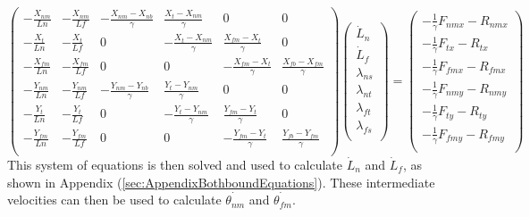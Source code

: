 \documentclass[
11pt, %
english, %
singlespacing, %
headsepline, %
chapterinoneline, %
]{MastersDoctoralThesis} %
\begin{document}
\[
\begin{pmatrix}
  -\frac{X_{nm}}{Ln} & -\frac{X_{nm}}{Lf}
  & -\frac{X_{nm}-X_{nb}}{\gamma} & \frac{X_{t}-X_{nm}}{\gamma} & 0 & 0\\
  -\frac{X_{t}}{Ln} & -\frac{X_{t}}{Lf}
  & 0 & -\frac{X_{t}-X_{nm}}{\gamma} & \frac{X_{fm}-X_{t}}{\gamma} & 0\\
  -\frac{X_{fm}}{Ln} & -\frac{X_{fm}}{Lf}
  & 0 & 0 & -\frac{X_{fm}-X_{t}}{\gamma} & \frac{X_{fb}-X_{fm}}{\gamma}\\
  -\frac{Y_{nm}}{Ln} & -\frac{Y_{nm}}{Lf}
  & -\frac{Y_{nm}-Y_{nb}}{\gamma} & \frac{Y_{t}-Y_{nm}}{\gamma} & 0 & 0\\
  -\frac{Y_{t}}{Ln} & -\frac{Y_{t}}{Lf}
  & 0 & -\frac{Y_{t}-Y_{nm}}{\gamma} & \frac{Y_{fm}-Y_{t}}{\gamma} & 0\\
  -\frac{Y_{fm}}{Ln} & -\frac{Y_{fm}}{Lf}
  & 0 & 0 & -\frac{Y_{fm}-Y_{t}}{\gamma} & \frac{Y_{fb}-Y_{fm}}{\gamma}\\
\end{pmatrix}
\begin{pmatrix}
  \dot{L}_n\\
  \dot{L}_f\\
  \lambda_{ns}\\
  \lambda_{nt}\\
  \lambda_{ft}\\
  \lambda_{fs}\\
\end{pmatrix}
=
\begin{pmatrix}
  -\frac{1}{\gamma}F_{nmx} - R_{nmx}\\
  -\frac{1}{\gamma}F_{tx}  - R_{tx}\\
  -\frac{1}{\gamma}F_{fmx} - R_{fmx}\\
  -\frac{1}{\gamma}F_{nmy} - R_{nmy}\\
  -\frac{1}{\gamma}F_{ty}  - R_{ty}\\
  -\frac{1}{\gamma}F_{fmy} - R_{fmy}\\
\end{pmatrix}
\]
%
This system of equations is then solved and used to calculate $\dot{L}_n$ and $\dot{L}_f$, as shown in Appendix (\ref{sec:AppendixBothboundEquations}). These intermediate velocities can then be used to calculate $\dot{\theta_{nm}}$ and $\dot{\theta_{fm}}$.\\

\end{document}
